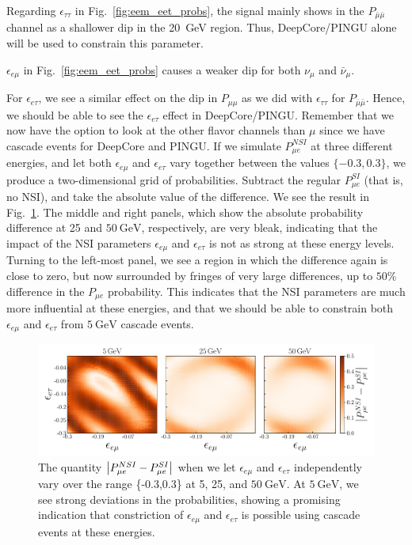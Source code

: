 \documentclass{article}
\newcommand{\eet}{\epsilon_{e\tau}}
\newcommand{\eem}{\epsilon_{e\mu}}
\newcommand{\ett}{\ensuremath{\epsilon_{\tau\tau}}}
\newcommand{\nm}{\nu_\mu}
\newcommand{\anm}{\bar\nu_\mu}
\newcommand{\Pme}{P_{\mu  e}}
\newcommand{\Pmm}{P_{\mu\mu}}
\newcommand{\Pamam}{P_{\bar{\mu}  \bar{\mu}}}
\begin{document}
Regarding $\ett$ in Fig.~\ref{fig:eem_eet_probs}, the signal mainly shows in the $\Pamam$ channel as
a shallower dip in the \SI{20}{\GeV} region. Thus, DeepCore/PINGU alone will be used to constrain this parameter.

$\eem$ in Fig.~\ref{fig:eem_eet_probs} causes a weaker dip for both $\nm$ and $\anm$. 


For $\eet$, we see a similar effect on the dip in $\Pmm$ as we did with $\ett$ for $\Pamam$. Hence, we should be able to 
see the $\eet$ effect in DeepCore/PINGU. Remember that we now have the option to look at the other flavor channels than $\mu$ since we 
have cascade events for DeepCore and PINGU. If we simulate 
$\Pme^{NSI}$ at three different energies, and let both $\eem$ and $\eet$ vary together between the values $\{-0.3,0.3\}$, we produce a two-dimensional grid of probabilities.
Subtract the regular $\Pme^{SI}$ (that is, no NSI), and take the absolute value of the difference. We see the result in Fig.~\ref{fig:eem_eet_prob}. 
The middle and right panels, which show the absolute probability difference at \si{25} and $\SI{50}{\GeV}$, respectively, are very bleak,
indicating that the impact of the NSI parameters $\eem$ and $\eet$ is not as strong at these energy levels. Turning to the left-most panel,
we see a region in which the difference again is close to zero, but now surrounded by fringes of very large differences, up to $50\%$ difference 
in the $\Pme$ probability. This indicates that the NSI parameters are much more influential at these energies, and that we should be able to 
constrain both $\eem$ and $\eet$ from $\SI{5}{\GeV}$ cascade events.

\begin{figure}
    \centering
    \includegraphics[width=1\textwidth]{figures/eem_eet_prob.pdf}
    \caption{The quantity $\abs{P_{\mu e}^{NSI} - P_{\mu e}^{SI}}$ when we let $\eem$ and $\eet$ independently vary over
    the range \{-0.3,0.3\} at \si{5}, \si{25}, and $\SI{50}{\GeV}$. At $\SI{5}{\GeV}$, we see strong deviations in the probabilities, showing
    a promising indication that constriction of $\eem$ and $\eet$ is possible using cascade events at these energies.}\label{fig:eem_eet_prob}
\end{figure}
\end{document}
